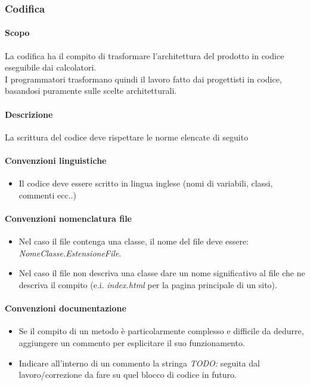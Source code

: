 \documentclass[a4paper, 12pt]{article}
\begin{document}
\subsubsection{Codifica}
\paragraph{Scopo}
La codifica ha il compito di trasformare l'architettura del prodotto in codice eseguibile dai calcolatori.\\
I programmatori trasformano quindi il lavoro fatto dai progettisti in codice, basandosi puramente sulle scelte architetturali.
\paragraph{Descrizione}
La scrittura del codice deve rispettare le norme elencate di seguito
\paragraph{Convenzioni linguistiche}
\begin{itemize}
	\item Il codice deve essere scritto in lingua inglese (nomi di variabili, classi, commenti ecc..)
\end{itemize}
\paragraph{Convenzioni nomenclatura file}
	\begin{itemize}
		\item Nel caso il file contenga una classe, il nome del file deve essere: \textit{NomeClasse.EstensioneFile}.
		\item Nel caso il file non descriva una classe dare un nome significativo al file che ne descriva il compito
		(e.i. \textit{index.html} per la pagina principale di un sito).
	\end{itemize}
\paragraph{Convenzioni documentazione}
	\begin{itemize}
		\item Se il compito di un metodo è particolarmente complesso e difficile da dedurre, aggiungere un commento
		per esplicitare il suo funzionamento.
		\item Indicare all'interno di un commento la stringa \textit{TODO:} seguita dal lavoro/correzione da fare su quel
		blocco di codice in futuro.
	\end{itemize}
\end{document}
